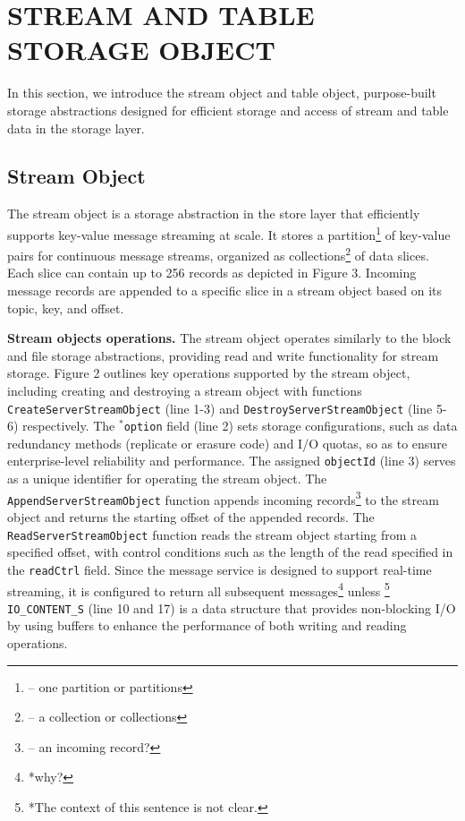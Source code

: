 \section{STREAM AND TABLE STORAGE OBJECT} 
\label{sec:datagen}

In this section, we introduce the stream object and table object, purpose-built storage abstractions designed for efficient storage and access of stream and table data in the storage layer.


\subsection{Stream Object}

The stream object is a storage abstraction in the store layer that efficiently supports key-value message streaming at scale. It stores a partition\footnote{-- one partition or partitions} of key-value pairs for continuous message streams, organized as collections\footnote{-- a collection or collections} of data slices. Each slice can contain up to 256 records as depicted in Figure 3. Incoming message records are appended  to a specific slice in a stream object based on its topic, key, and offset.

\noindent \textbf{Stream objects operations.} The stream object operates similarly to the block and file storage abstractions, providing read and write functionality for stream storage. Figure 2 outlines key operations supported by the stream object, including creating and destroying a stream object with  functions \texttt{CreateServerStreamObject} (line 1-3) and \texttt{DestroyServerStreamObject} (line 5-6) respectively. The \texttt{$^*$option} field (line 2) sets storage configurations, such as data redundancy methods (replicate or erasure code) and I/O quotas, so as to ensure enterprise-level reliability and performance. The assigned \texttt{objectId} (line 3) serves as a unique identifier for operating the stream object. The \texttt{AppendServerStreamObject} function appends incoming records\footnote{-- an incoming record?}  to the stream object and returns the starting offset of the appended records. The \texttt{ReadServerStreamObject} function reads the stream object starting from a specified offset, with control conditions such as the length of the read specified in the \texttt{readCtrl} field. 
Since the message service is designed to support real-time streaming, it is configured to return all subsequent messages\footnote{*why?} unless \footnote{*The context of this sentence is not clear.} \texttt{IO\_CONTENT\_S} (line 10 and 17) is a data structure that provides non-blocking I/O by using buffers to enhance the performance of both writing and reading operations.



